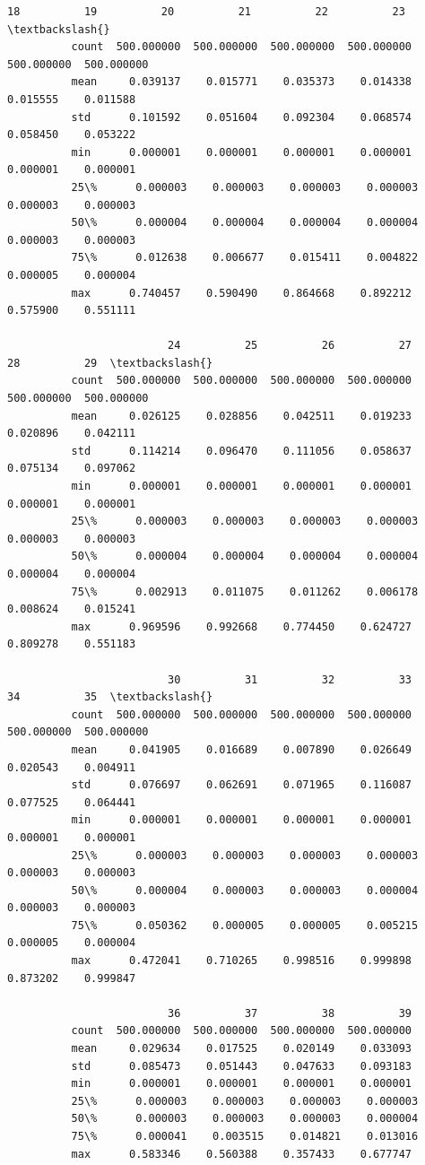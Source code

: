 \documentclass[11pt]{article}
\begin{document}
\begin{Verbatim}[commandchars=\\\{\}]
                         18          19          20          21          22          23  \textbackslash{}
          count  500.000000  500.000000  500.000000  500.000000  500.000000  500.000000   
          mean     0.039137    0.015771    0.035373    0.014338    0.015555    0.011588   
          std      0.101592    0.051604    0.092304    0.068574    0.058450    0.053222   
          min      0.000001    0.000001    0.000001    0.000001    0.000001    0.000001   
          25\%      0.000003    0.000003    0.000003    0.000003    0.000003    0.000003   
          50\%      0.000004    0.000004    0.000004    0.000004    0.000003    0.000003   
          75\%      0.012638    0.006677    0.015411    0.004822    0.000005    0.000004   
          max      0.740457    0.590490    0.864668    0.892212    0.575900    0.551111   
          
                         24          25          26          27          28          29  \textbackslash{}
          count  500.000000  500.000000  500.000000  500.000000  500.000000  500.000000   
          mean     0.026125    0.028856    0.042511    0.019233    0.020896    0.042111   
          std      0.114214    0.096470    0.111056    0.058637    0.075134    0.097062   
          min      0.000001    0.000001    0.000001    0.000001    0.000001    0.000001   
          25\%      0.000003    0.000003    0.000003    0.000003    0.000003    0.000003   
          50\%      0.000004    0.000004    0.000004    0.000004    0.000004    0.000004   
          75\%      0.002913    0.011075    0.011262    0.006178    0.008624    0.015241   
          max      0.969596    0.992668    0.774450    0.624727    0.809278    0.551183   
          
                         30          31          32          33          34          35  \textbackslash{}
          count  500.000000  500.000000  500.000000  500.000000  500.000000  500.000000   
          mean     0.041905    0.016689    0.007890    0.026649    0.020543    0.004911   
          std      0.076697    0.062691    0.071965    0.116087    0.077525    0.064441   
          min      0.000001    0.000001    0.000001    0.000001    0.000001    0.000001   
          25\%      0.000003    0.000003    0.000003    0.000003    0.000003    0.000003   
          50\%      0.000004    0.000003    0.000003    0.000004    0.000003    0.000003   
          75\%      0.050362    0.000005    0.000005    0.005215    0.000005    0.000004   
          max      0.472041    0.710265    0.998516    0.999898    0.873202    0.999847   
          
                         36          37          38          39  
          count  500.000000  500.000000  500.000000  500.000000  
          mean     0.029634    0.017525    0.020149    0.033093  
          std      0.085473    0.051443    0.047633    0.093183  
          min      0.000001    0.000001    0.000001    0.000001  
          25\%      0.000003    0.000003    0.000003    0.000003  
          50\%      0.000003    0.000003    0.000003    0.000004  
          75\%      0.000041    0.003515    0.014821    0.013016  
          max      0.583346    0.560388    0.357433    0.677747  
\end{Verbatim}
\end{document}
